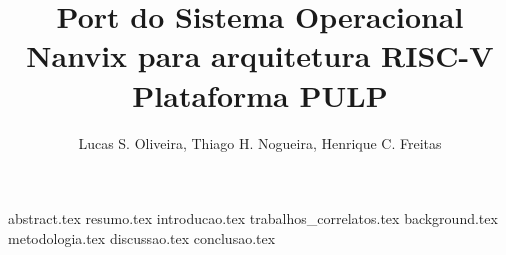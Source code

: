 \documentclass[12pt]{article}
\title{Port do Sistema Operacional Nanvix para arquitetura RISC-V Plataforma PULP}
\author{Lucas S. Oliveira\inst{1}, Thiago H. Nogueira\inst{1}, Henrique C. Freitas\inst{1}}
\begin{document}
    \maketitle

    {abstract.tex}
    {resumo.tex}
    {introducao.tex}
    {trabalhos_correlatos.tex}
    {background.tex}
    {metodologia.tex}
    {discussao.tex}
    {conclusao.tex}
    
    
    
\end{document}
